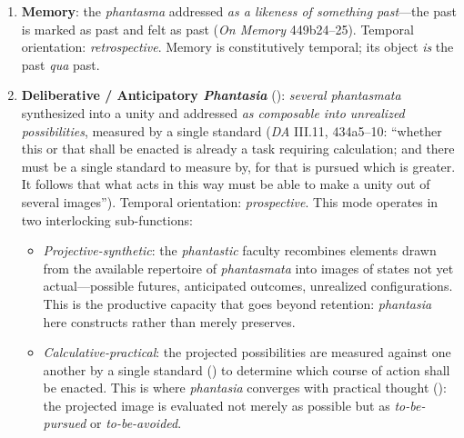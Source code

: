 \begin{itemize}
\begin{itemize}
\begin{itemize}
\begin{enumerate}
                  \item \textbf{Memory}: the \textit{phantasma} addressed \textit{as
                  a likeness of something past}---the past is marked as past and
                  felt as past (\textit{On Memory} 449b24--25). Temporal orientation:
                  \textit{retrospective}. Memory is constitutively temporal; its
                  object \textit{is} the past \textit{qua} past.

                  \item \textbf{Deliberative / Anticipatory \textit{Phantasia}}
                  (): \textit{several} \textit{phantasmata}
                  synthesized into a unity and addressed \textit{as composable into
                  unrealized possibilities}, measured by a single standard
                  (\textit{DA} III.11, 434a5--10: ``whether this or that shall be
                  enacted is already a task requiring calculation; and there must be
                  a single standard to measure by, for that is pursued which is
                  greater. It follows that what acts in this way must be able to make
                  a unity out of several images''). Temporal orientation:
                  \textit{prospective}. This mode operates in two interlocking
                  sub-functions:
                  \begin{itemize}
                      \item \textit{Projective-synthetic}: the \textit{phantastic}
                      faculty recombines elements drawn from the available repertoire
                      of \textit{phantasmata} into images of states not yet
                      actual---possible futures, anticipated outcomes, unrealized
                      configurations. This is the productive capacity that goes beyond
                      retention: \textit{phantasia} here constructs rather than
                      merely preserves.
                      \item \textit{Calculative-practical}: the projected
                      possibilities are measured against one another by a single
                      standard () to determine which
                      course of action shall be enacted. This is where
                      \textit{phantasia} converges with practical thought
                      (): the projected image is evaluated not
                      merely as possible but as \textit{to-be-pursued} or
                      \textit{to-be-avoided}.

\end{itemize}
\end{enumerate}
\end{itemize}
\end{itemize}
\end{itemize}
